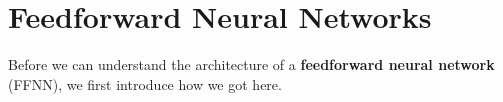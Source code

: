 \section{Feedforward Neural Networks}
Before we can understand the architecture of a \textbf{feedforward neural network} (FFNN), we first introduce
how we got here.










